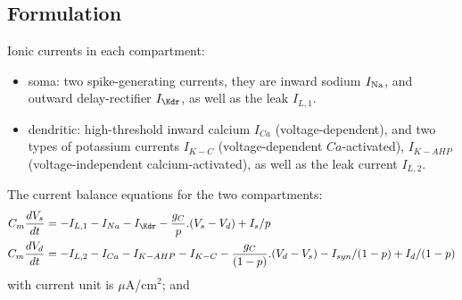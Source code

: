 \subsection{Formulation}
\label{sec:formulation-1}

Ionic currents in each compartment:
\begin{itemize}
\item soma: two spike-generating currents, they are inward sodium
  $I_{\ce{Na}}$, and outward delay-rectifier $I_\Kdr$, as well as the
  leak $I_{L,1}$.
\item dendritic: high-threshold inward calcium $I_{Ca}$
  (voltage-dependent), and two types of potassium currents $I_{K-C}$
  (voltage-dependent $Ca$-activated), $I_{K-AHP}$ (voltage-independent
  calcium-activated), as well as the leak current $I_{L,2}$.
\end{itemize}
The current balance equations for the two compartments:
\begin{equation}
  \label{eq:563}
  \begin{split}
    C_m\frac{dV_s}{dt} &= -I_{L,1} - I_{Na} - I_\Kdr  -
    \frac{g_C}{p}.(V_s-V_d) + I_{s}/p \\
    C_m\frac{dV_d}{dt} &= -I_{L,2} - I_{Ca} - I_{K-AHP} - I_{K-C} -
    \frac{g_C}{(1-p)}.(V_d-V_s) - I_{syn}/(1-p) + 
I_d/(1-p)
  \end{split}
\end{equation}
with current unit is $\mu$A/cm$^2$; and
